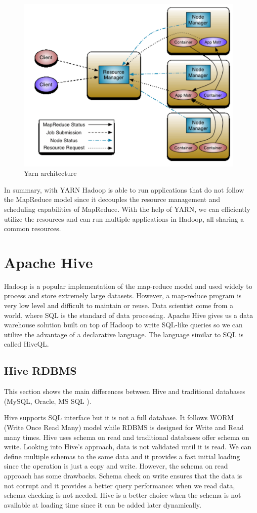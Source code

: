 \begin{figure}[H]
	\includegraphics[width=120mm, keepaspectratio]{figures/yarn.png}
	\centering
	\caption*{Yarn architecture}
	\centering
\end{figure}

In summary, with YARN Hadoop is able to run applications that do not follow the MapReduce model since it decouples the resource management and scheduling capabilities of MapReduce. With the help of YARN, we can efficiently utilize the resources and can run multiple applications in Hadoop, all sharing a common resources.

\clearpage
\section{Apache Hive}
Hadoop is a popular implementation of the map-reduce model and used widely to process and store extremely large datasets. However, a map-reduce program is very low level and difficult to maintain or reuse. Data scientist come from a world, where SQL is the standard of data processing. Apache Hive gives us a data warehouse solution built on top of Hadoop to write SQL-like queries so we can utilize the advantage of a declarative language. The language similar to SQL is called HiveQL.

\subsection{Hive \vs RDBMS}
This section shows the main differences between Hive and traditional databases (\eg MySQL, Oracle, MS SQL \etc).

Hive supports SQL interface but it is not a full database. It follows WORM (Write Once Read Many) model while RDBMS is designed for Write and Read many times. Hive uses schema on read and traditional databases offer schema on write. Looking into Hive's approach, data is not validated until it is read. We can define multiple schemas to the same data and it provides a fast initial loading since the operation is just a copy and write. However, the schema on read approach has some drawbacks. Schema check on write ensures that the data is not corrupt and it provides a better query performance: when we read data, schema checking is not needed. Hive is a better choice when the schema is not available at loading time since it can be added later dynamically. 

